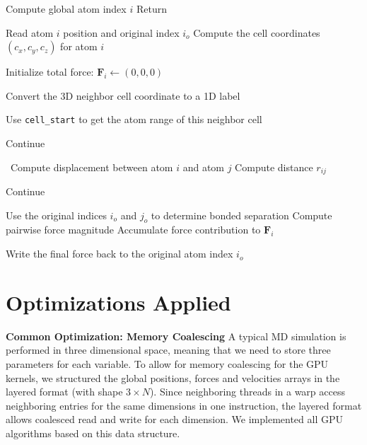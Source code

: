\documentclass[12pt]{article}
\begin{document}
\begin{algorithm}
\caption{Cutoff Force Computation with Compact Cell List}\label{algo:force_compute}
\begin{algorithmic}[1]

\State Compute global atom index $i$
    \State Return
\EndIf

\State Read atom $i$ position and original index $i_o$
\State Compute the cell coordinates $(c_x, c_y, c_z)$ for atom $i$

\State Initialize total force:
\State \hspace{1em} $\mathbf{F}_i \gets (0,0,0)$

    \State Convert the 3D neighbor cell coordinate to a 1D label

    \State Use \texttt{cell\_start} to get the atom range of this neighbor cell

            \State Continue
        \EndIf

        \
        \State Compute displacement between atom $i$ and atom $j$
        \State Compute distance $r_{ij}$

            \State Continue
        \EndIf

        \State Use the original indices $i_o$ and $j_o$ to determine bonded separation
        \State Compute pairwise force magnitude
        \State Accumulate force contribution to $\mathbf{F}_i$
    \EndFor
\EndFor

\State Write the final force back to the original atom index $i_o$

\end{algorithmic}
\end{algorithm}

\section{Optimizations Applied}

\textbf{Common Optimization: Memory Coalescing} A typical MD simulation is performed in three dimensional space, meaning that we need to store three parameters for each variable. To allow for memory coalescing for the GPU kernels, we structured the global positions, forces and velocities arrays in the layered format (with shape $3\times N$). Since neighboring threads in a warp access neighboring entries for the same dimensions in one instruction, the layered format allows coalesced read and write for each dimension. We implemented all GPU algorithms based on this data structure.
\end{document}
